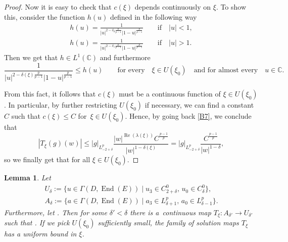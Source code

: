 \documentclass[11pt]{article}
\numberwithin{equation}{section}
\newtheorem{Lemma}[Theorem]{Lemma}
\numberwithin{equation}{section}
\begin{document}
\begin{proof}
Now it is easy to check that $c(\xi)$ depends continuously on $\xi$. To show this, consider the function $h(u)$ defined in the following way
\begin{gather*}
 h(u)=\frac{1}{|u|^{2-\delta_0\frac{p}{p-1}}|1-u|^{\frac{p}{p-1}}} \qquad \text{if} \quad |u|< 1,\\
 h(u)=\frac{1}{|u|^{2-\delta_1\frac{p}{p-1}}|1-u|^{\frac{p}{p-1}}} \qquad \text{if} \quad |u|> 1.
\end{gather*}
Then we get that $h \in L^1(\mathbb{C})$ and furthermore
\begin{equation*}
 \frac{1}{|u|^{2-\delta(\xi)\frac{p}{p-1}}|1-u|^{\frac{p}{p-1}}}\leq h(u) \qquad \text{for every}\quad \xi \in U(\xi_0)\quad \text{and for almost every} \quad u \in \mathbb{C}.
\end{equation*}

From this fact, it follows that $c(\xi)$ must be a continuous function of $\xi \in U(\xi_0)$. In particular, by further restricting $U(\xi_0)$ if necessary, we can find a constant $C$ such that $c(\xi)\leq C$ for~${\xi \in U(\xi_0)}$. Hence, by going back \eqref{B7}, we conclude that
\begin{equation*}
 |T_{\xi}(g)(w)|\leq |g|_{L^p_{-2+\delta}} \frac{|w|^{\operatorname{Re}(\lambda(\xi))}C^{\frac{p-1}{p}}}{|w|^{1-\delta(\xi)}}=|g|_{L^p_{-2+\delta}} \frac{C^{\frac{p-1}{p}}}{|w|^{1-\delta}},
\end{equation*}
so we finally get that
 for all $ \xi \in U(\xi_0)$.
\end{proof}

\begin{Lemma} Let
\begin{gather*}
U_{\delta}:=\bigl\{u \in \Gamma(D,\operatorname{End}(E)) \mid u_3 \in C^0_{2+\delta},\, u_0 \in C^0_{\delta}\bigr\},\\
A_{\delta}:= \bigl\{a \in \Gamma(D,\operatorname{End}(E)) \mid a_3 \in L^{p}_{\delta+1},\, a_0 \in L^{p}_{\delta-1}\bigr\}.
\end{gather*}
 Furthermore, let . Then for some $\delta'<\delta$ there is a~continuous map $T_{\xi}\colon A_{\delta'}\to U_{\delta'}$ such that . If we pick $U(\xi_0)$ sufficiently small, the family of solution maps $T_{\xi}$ has a uniform bound in $\xi$.
\end{Lemma}
\end{document}
